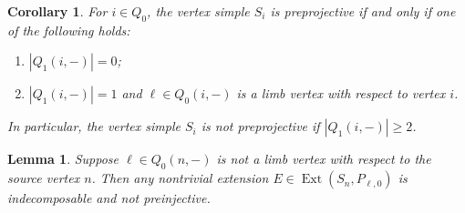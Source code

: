 \documentclass{amsart}
\newtheorem{corollary}[theorem]{Corollary}
\newtheorem{lemma}[theorem]{Lemma}
\numberwithin{equation}{section}
\newcommand{\Ext}{\operatorname{Ext}}
\begin{document}
\begin{corollary}
  \label{cor:simpleregular}
  For $i\in Q_0$, the vertex simple $S_i$ is preprojective if and only if one of the following holds: 
  \begin{enumerate}
    \item $|Q_1(i,-)|=0$;
    \item $|Q_1(i,-)|=1$ and $\ell\in Q_0(i,-)$ is a limb vertex with respect to vertex $i$. %
  \end{enumerate}
  In particular, the vertex simple $S_i$ is not preprojective if $|Q_1(i,-)|\geq 2$.
\end{corollary}

\begin{lemma}
  \label{le:nonlimb extensions}
  Suppose $\ell\in Q_0(n,-)$ is not a limb vertex with respect to the source vertex $n$.
  Then any nontrivial extension $E\in\Ext(S_n,P_{\ell,0})$ is indecomposable and not preinjective.
\end{lemma}
\end{document}
